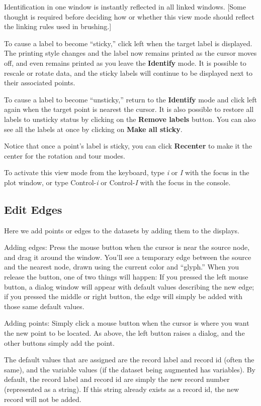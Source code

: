 \documentclass[11pt]{article}
\begin{document}
Identification in one window is instantly reflected in all linked windows.
[Some thought is required before deciding how or whether this view mode
should reflect the linking rules used in brushing.]

To cause a label to become ``sticky,'' click left when the target
label is displayed.  The printing style changes and the label now
remains printed as the cursor moves off, and even remains printed as
you leave the {\bf Identify} mode.  It is possible to rescale or
rotate data, and the sticky labels will continue to be displayed next
to their associated points.

To cause a label to become ``unsticky,'' return to the {\bf Identify}
mode and click left again when the target point is nearest the
cursor.  It is also possible to restore all labels to unsticky status
by clicking on the {\bf Remove labels} button.  You can also see all
the labels at once by clicking on {\bf Make all sticky}.

Notice that once a point's label is sticky, you can click {\bf Recenter}
to make it the center for the rotation and tour modes.

To activate this view mode from the keyboard, type {\em i} or {\em I}
with the focus in the plot window, or type Control-{\em i} or
Control-{\em I} with the focus in the console.

\subsection{Edit Edges}
\label{slbl:EditEdges}

Here we add points or edges to the datasets by adding them to
the displays.  

Adding edges:  Press the mouse button when the cursor is near the
source node, and drag it around the window.  You'll see a temporary
edge between the source and the nearest node, drawn using the current
color and ``glyph.''  When you release the button, one of two things
will happen:  If you pressed the left mouse button, a dialog window
will appear with default values describing the new edge; if you
pressed the middle or right button, the edge will simply be added
with those same default values.

Adding points:  Simply click a mouse button when the cursor is
where you want the new point to be located.  As above, the left
button raises a dialog, and the other buttons simply add the point.

The default values that are assigned are the record label and record
id (often the same), and the variable values (if the dataset being
augmented has variables).  By default, the record label and record id
are simply the new record number (represented as a string).  If this
string already exists as a record id, the new record will not be added.
\end{document}

